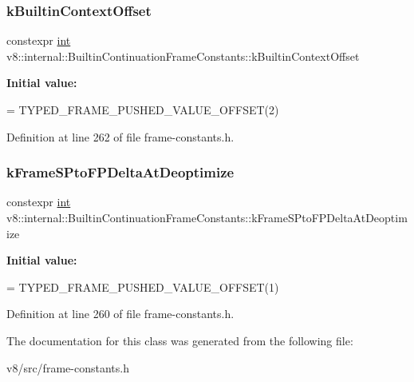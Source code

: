 \subsubsection{\texorpdfstring{k\+Builtin\+Context\+Offset}{kBuiltinContextOffset}}
{\footnotesize\ttfamily constexpr \mbox{\hyperlink{classint}{int}} v8\+::internal\+::\+Builtin\+Continuation\+Frame\+Constants\+::k\+Builtin\+Context\+Offset\hspace{0.3cm}{\ttfamily [static]}}

{\bfseries Initial value\+:}
\begin{DoxyCode}
=
      TYPED\_FRAME\_PUSHED\_VALUE\_OFFSET(2)
\end{DoxyCode}


Definition at line 262 of file frame-\/constants.\+h.

\mbox{\label{classv8_1_1internal_1_1BuiltinContinuationFrameConstants_ac3643ace62c0ed3714a13930375c34cf}} 
\subsubsection{\texorpdfstring{k\+Frame\+S\+Pto\+F\+P\+Delta\+At\+Deoptimize}{kFrameSPtoFPDeltaAtDeoptimize}}
{\footnotesize\ttfamily constexpr \mbox{\hyperlink{classint}{int}} v8\+::internal\+::\+Builtin\+Continuation\+Frame\+Constants\+::k\+Frame\+S\+Pto\+F\+P\+Delta\+At\+Deoptimize\hspace{0.3cm}{\ttfamily [static]}}

{\bfseries Initial value\+:}
\begin{DoxyCode}
=
      TYPED\_FRAME\_PUSHED\_VALUE\_OFFSET(1)
\end{DoxyCode}


Definition at line 260 of file frame-\/constants.\+h.



The documentation for this class was generated from the following file\+:\begin{DoxyCompactItemize}
\item 
v8/src/frame-\/constants.\+h\end{DoxyCompactItemize}
